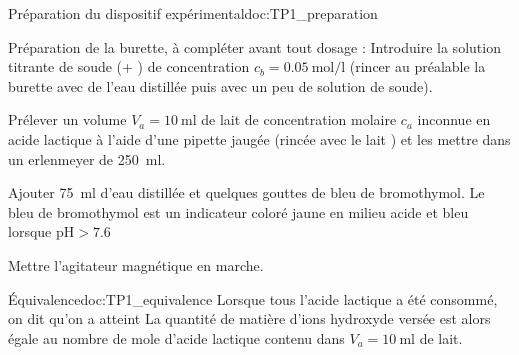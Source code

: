 \begin{doc}{Préparation du dispositif expérimental}{doc:TP1_preparation}
  \begin{protocole}
    \item Préparation de la burette, à compléter avant tout dosage :
    Introduire la solution titrante de soude (\ionSodium + \hydroxyde) de concentration $c_b = \qty{0,05}{\mol\per\litre}$ (rincer au préalable la burette avec de l’eau distillée puis avec un peu de solution de soude).
    \item Prélever un volume $V_a = \qty{10}{\ml}$ de lait de concentration molaire $c_a$ inconnue en acide lactique à l’aide d’une pipette jaugée (rincée avec le lait ) et les mettre dans un erlenmeyer de \qty{250}{\ml}.
    \item Ajouter \qty{75}{\ml} d’eau distillée et quelques gouttes
    de bleu de bromothymol. Le bleu de bromothymol est un indicateur coloré jaune en milieu acide et bleu lorsque $\text{pH} > \num{7,6}$
    \item Mettre l’agitateur magnétique en marche.
  \end{protocole}
\end{doc}


\begin{doc}{Équivalence}{doc:TP1_equivalence}
  Lorsque tous l'acide lactique a été consommé, on dit qu'on a atteint 
  La quantité de matière d’ions hydroxyde \hydroxyde versée est alors égale au nombre de mole
  d’acide lactique contenu dans $V_a = \qty{10}{\ml}$ de lait.
\end{doc}







